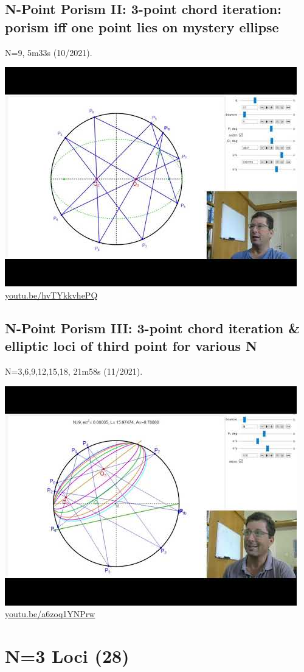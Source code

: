 \documentclass[12pt]{amsart}
\begin{document}
\subsection{N-Point Porism II: 3-point chord iteration: porism iff one point lies on mystery ellipse}
\label{vid:hvTYkkvhePQ}
\noindent N=9, 5m33s (10/2021). 
\begin{center}\includegraphics[width=.5\textwidth]{pics/hvTYkkvhePQ.jpg} \\ 
\href{https://youtu.be/hvTYkkvhePQ}{\url{youtu.be/hvTYkkvhePQ}}\end{center}
% 

\subsection{N-Point Porism III: 3-point chord iteration \& elliptic loci of third point for various N}
\label{vid:a6zoq1YNPrw}
\noindent N=3,6,9,12,15,18, 21m58s (11/2021). 
\begin{center}\includegraphics[width=.5\textwidth]{pics/a6zoq1YNPrw.jpg} \\ 
\href{https://youtu.be/a6zoq1YNPrw}{\url{youtu.be/a6zoq1YNPrw}}\end{center}
% 


\section{N=3 Loci (28)}
\end{document}
